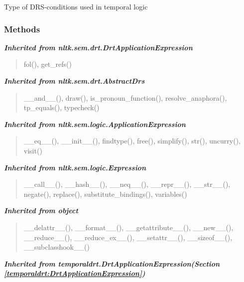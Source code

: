 Type of DRS-conditions used in temporal logic



  \subsubsection{Methods}


\large{\textbf{\textit{Inherited from nltk.sem.drt.DrtApplicationExpression}}}

\begin{quote}
fol(), get\_refs()
\end{quote}

\large{\textbf{\textit{Inherited from nltk.sem.drt.AbstractDrs}}}

\begin{quote}
\_\_and\_\_(), draw(), is\_pronoun\_function(), resolve\_anaphora(), tp\_equals(), typecheck()
\end{quote}

\large{\textbf{\textit{Inherited from nltk.sem.logic.ApplicationExpression}}}

\begin{quote}
\_\_eq\_\_(), \_\_init\_\_(), findtype(), free(), simplify(), str(), uncurry(), visit()
\end{quote}

\large{\textbf{\textit{Inherited from nltk.sem.logic.Expression}}}

\begin{quote}
\_\_call\_\_(), \_\_hash\_\_(), \_\_neq\_\_(), \_\_repr\_\_(), \_\_str\_\_(), negate(), replace(), substitute\_bindings(), variables()
\end{quote}

\large{\textbf{\textit{Inherited from object}}}

\begin{quote}
\_\_delattr\_\_(), \_\_format\_\_(), \_\_getattribute\_\_(), \_\_new\_\_(), \_\_reduce\_\_(), \_\_reduce\_ex\_\_(), \_\_setattr\_\_(), \_\_sizeof\_\_(), \_\_subclasshook\_\_()
\end{quote}

\large{\textbf{\textit{Inherited from temporaldrt.DrtApplicationExpression\textit{(Section \ref{temporaldrt:DrtApplicationExpression})}}}}

    \vspace{0.5ex}

